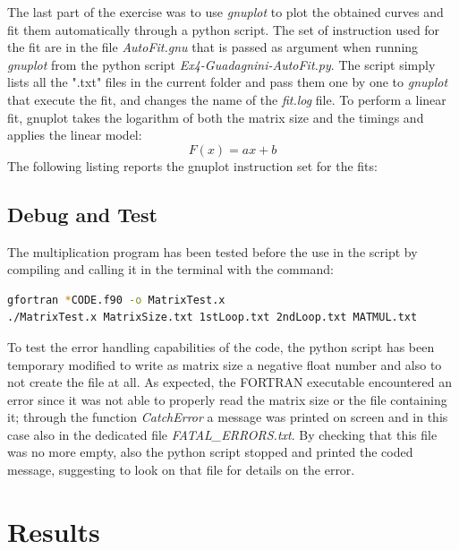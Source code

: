 \documentclass[11pt,a4paper]{article}
\begin{document}
The last part of the exercise was to use \textit{gnuplot} to plot the obtained curves and fit them automatically through a python script.
The set of instruction used for the fit are in the file \textit{AutoFit.gnu} that is passed as argument when running \textit{gnuplot} from the python script \textit{Ex4-Guadagnini-AutoFit.py}. 
The script simply lists all the ".txt" files in the current folder and pass them one by one to \textit{gnuplot} that execute the fit, and changes the name of the \textit{fit.log} file. 
To perform a linear fit, gnuplot takes the logarithm of both the matrix size and the timings and applies the linear model:
\begin{equation*}
F(x) = ax + b
\end{equation*}
The following listing reports the gnuplot instruction set for the fits:


\subsection{Debug and Test}
The multiplication program has been tested before the use in the script by compiling and calling it in the terminal with the command:
\begin{lstlisting}[language=BASH, numbers=none]
gfortran *CODE.f90 -o MatrixTest.x
./MatrixTest.x MatrixSize.txt 1stLoop.txt 2ndLoop.txt MATMUL.txt
\end{lstlisting}

To test the error handling capabilities of the code, the python script has been temporary modified to write as matrix size a negative float number and also to not create the file at all. 
As expected, the FORTRAN executable encountered an error since it was not able to properly read the matrix size or the file containing it; through the function \textit{CatchError} a message was printed on screen and in this case also in the dedicated file \textit{FATAL\_ERRORS.txt}. 
By checking that this file was no more empty, also the python script stopped and printed the coded message, suggesting to look on that file for details on the error.

\section{Results} %
\end{document}
